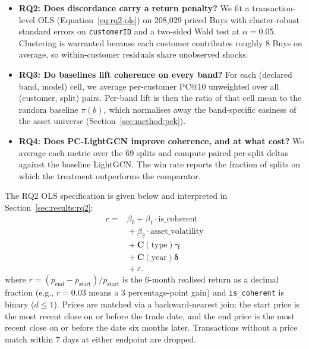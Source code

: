 \begin{itemize}
    \item \textbf{RQ2: Does discordance carry a return penalty?} We fit a transaction-level OLS (Equation~\ref{eq:rq2-ols}) on 208{,}029 priced Buys with cluster-robust standard errors on \texttt{customerID} and a two-sided Wald test at $\alpha = 0.05$. Clustering is warranted because each customer contributes roughly 8 Buys on average, so within-customer residuals share unobserved shocks.
    \item \textbf{RQ3: Do baselines lift coherence on every band?} For each (declared band, model) cell, we average per-customer PC@10 unweighted over all (customer, split) pairs. Per-band lift is then the ratio of that cell mean to the random baseline $\pi(b)$, which normalises away the band-specific easiness of the asset universe (Section~\ref{sec:method:pck}).
    \item \textbf{RQ4: Does PC-LightGCN improve coherence, and at what cost?} We average each metric over the 69 splits and compute paired per-split deltas against the baseline LightGCN. The win rate reports the fraction of splits on which the treatment outperforms the comparator.
\end{itemize}

The RQ2 OLS specification is given below and interpreted in Section~\ref{sec:results:rq2}:
\begin{equation}
\label{eq:rq2-ols}
\begin{split}
r ={}& \beta_0 + \beta_1 \cdot \text{is\_coherent} \\
    &{}+ \beta_2 \cdot \text{asset\_volatility} \\
    &{}+ \mathbf{C}(\text{type})\boldsymbol{\gamma} \\
    &{}+ \mathbf{C}(\text{year})\boldsymbol{\delta} \\
    &{}+ \varepsilon.
\end{split}
\end{equation}
where $r = (p_{\text{end}} - p_{\text{start}})/p_{\text{start}}$ is the 6-month realised return as a decimal fraction (e.g., $r = 0.03$ means a 3 percentage-point gain) and \texttt{is\_coherent} is binary ($d \leq 1$). Prices are matched via a backward-nearest join: the start price is the most recent close on or before the trade date, and the end price is the most recent close on or before the date six months later. Transactions without a price match within 7 days at either endpoint are dropped.
